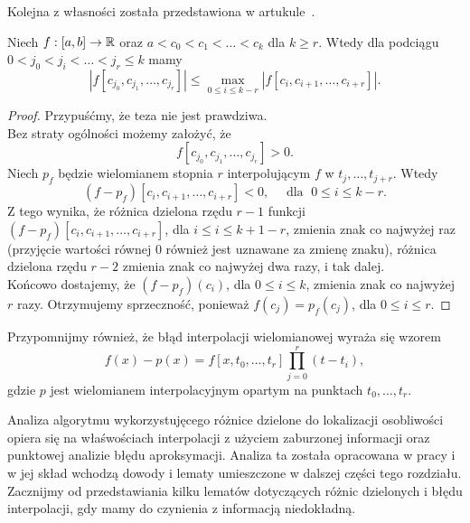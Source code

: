 \documentclass[oik, pdftex, robocza, man]{mgrwms}
\begin{document}
    Kolejna z własności została przedstawiona w artukule~\cite{UA}.
    \begin{lemma} \label{lem:4:wlasnosc_roznic_dzielonych_z_art_2009}
        Niech $f: [a,b] \rightarrow \mathbb{R}$ oraz $a < c_{0} <  c_{1} < \ldots < c_{k}$ dla $k \geq r$. Wtedy dla podciągu $0 < j_{0} < j_{i} < \ldots < j_{r} \leq k$ mamy
        \begin{equation*}
            \left| f[c_{j_{0}}, c_{j_{1}}, \ldots, c_{j_{r}}] \right| \leq \max_{0 \leq i \leq k-r} \left| f[c_{i}, c_{i+1}, \ldots, c_{i+r}] \right|.
        \end{equation*}
    \end{lemma}
    \begin{proof}
        Przypuśćmy, że teza nie jest prawdziwa. \\
        Bez straty ogólności możemy założyć, że
        \begin{equation*}
            f[c_{j_{0}}, c_{j_{1}}, \ldots, c_{j_{r}}]> 0.
        \end{equation*}
        Niech $p_{f}$ będzie wielomianem stopnia $r$ interpolującym $f$ w $t_{j}, \ldots, t_{j+r}$. Wtedy
        \begin{equation*}
            \left( f-p_{f} \right)[c_{i}, c_{i+1}, \ldots, c_{i+r}] < 0, \quad \text{ dla }\; 0 \leq i \leq k-r.
        \end{equation*}
        Z tego wynika, że różnica dzielona rzędu $r-1$ funkcji $\left( f-p_{f} \right)[c_{i}, c_{i+1}, \ldots, c_{i+r}]$, dla $i \leq i \leq k+1-r$, zmienia znak co najwyżej raz (przyjęcie wartości równej 0 również jest uznawane za zmienę znaku), różnica dzielona rzędu $r-2$ zmienia znak co najwyżej dwa razy, i tak dalej. \\
        Końcowo dostajemy, że $(f-p_{f})(c_{i})$, dla $0 \leq i \leq k$, zmienia znak co najwyżej $r$ razy. Otrzymujemy sprzeczność, ponieważ $f(c_{j}) = p_{f}(c_{j})$, dla $0 \leq i \leq r$.

    \end{proof}

    Przypomnijmy również, że błąd interpolacji wielomianowej wyraża się wzorem
    \begin{equation*} \label{eq:34:blad_interpolacji_lagrangea}
        f(x) - p(x) = f[x, t_{0}, \ldots, t_{r}] \prod_{j = 0}^{r} (t - t_{i}),
    \end{equation*}
    gdzie $p$ jest wielomianem interpolacyjnym opartym na punktach $t_{0}, \ldots, t_{r}$.

    Analiza algorytmu wykorzystujęcego różnice dzielone do lokalizacji osobliwości opiera się na właśwościach interpolacji z użyciem zaburzonej informacji oraz punktowej analizie błędu aproksymacji. Analiza ta została opracowana w pracy \cite{AoP} i w jej skład wchodzą dowody i lematy umieszczone w dalszej części tego rozdziału. Zacznijmy od przedstawiania kilku lematów dotyczących różnic dzielonych i błędu interpolacji, gdy mamy do czynienia z informacją niedokładną.
    
\end{document}
